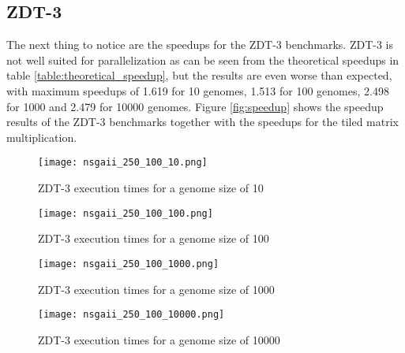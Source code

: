 
\subsection{ZDT-3}
\label{chap:evaluation:result:zdt3}
The next thing to notice are the speedups for the ZDT-3 benchmarks. ZDT-3 is not well suited for parallelization as can be seen from the theoretical speedups in table \ref{table:theoretical_speedup}, but the results are even worse than expected, with maximum speedups of 1.619 for 10 genomes, 1.513 for 100 genomes, 2.498 for 1000 and 2.479 for 10000 genomes. Figure \ref{fig:speedup} shows the speedup results of the ZDT-3 benchmarks together with the speedups for the tiled matrix multiplication.

\begin{figure}[ht!]
  \centering
  \texttt{[image: nsgaii\_250\_100\_10.png]}
  \caption{ZDT-3 execution times for a genome size of 10}
  \label{fig:nsga_250_100_10}
\end{figure}
\begin{figure}[ht!]
  \centering
  \texttt{[image: nsgaii\_250\_100\_100.png]}
  \caption{ZDT-3 execution times for a genome size of 100}
  \label{fig:nsga_250_100_100}
\end{figure}
\begin{figure}[ht!]
  \centering
  \texttt{[image: nsgaii\_250\_100\_1000.png]}
  \caption{ZDT-3 execution times for a genome size of 1000}
  \label{fig:nsga_250_100_1000}
\end{figure}
\begin{figure}[ht!]
  \centering
  \texttt{[image: nsgaii\_250\_100\_10000.png]}
  \caption{ZDT-3 execution times for a genome size of 10000}
  \label{fig:nsga_250_100_10000}
\end{figure}

